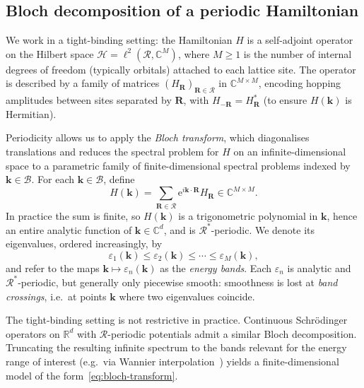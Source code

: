 \documentclass[11pt]{article}
\numberwithin{equation}{section}
\begin{document}
\subsection{Bloch decomposition of a periodic Hamiltonian}\label{sec:bloch}

We work in a tight-binding setting: the Hamiltonian \(H\) is a self-adjoint operator on
the Hilbert space \(\mathcal{H}=\ell^2(\mathcal{R},\mathbb{C}^M)\), where \(M \geq 1\) is the number
of internal degrees of freedom (typically orbitals) attached to each lattice site. The
operator is described by a family of matrices \((H_\mathbf{R})_{\mathbf{R} \in
    \mathcal{R}}\) in \(\mathbb{C}^{M\times M}\), encoding hopping amplitudes between sites
separated by \(\mathbf{R}\), with \(H_{-\mathbf{R}} = H_\mathbf{R}^*\) (to ensure
\(H(\mathbf{k})\) is Hermitian).

Periodicity allows us to apply the \emph{Bloch transform}, which diagonalises translations
and reduces the spectral problem for \(H\) on an infinite-dimensional space to a
parametric family of finite-dimensional spectral problems indexed by \(\mathbf{k} \in
\mathcal{B}\). For each \(\mathbf{k} \in \mathcal{B}\), define
\begin{equation}
    H(\mathbf{k}) = \sum_{\mathbf{R} \in \mathcal{R}}
    \mathrm{e}^{i\mathbf{k}\cdot\mathbf{R}} H_\mathbf{R}
    \in \mathbb{C}^{M\times M}.
    \label{eq:bloch-transform}
\end{equation}
In practice the sum is finite, so \(H(\mathbf{k})\) is a trigonometric polynomial in
\(\mathbf{k}\), hence an entire analytic function of \(\mathbf{k} \in \mathbb{C}^d\), and
is \(\mathcal{R}^*\)-periodic. We denote its eigenvalues, ordered increasingly, by
\begin{equation}
    \varepsilon_1(\mathbf{k}) \leq \varepsilon_2(\mathbf{k}) \leq \cdots
    \leq \varepsilon_M(\mathbf{k}),
\end{equation}
and refer to the maps \(\mathbf{k} \mapsto \varepsilon_n(\mathbf{k})\) as the \emph{energy
    bands}. Each \(\varepsilon_n\) is analytic and \(\mathcal{R}^*\)-periodic, but
generally only piecewise smooth: smoothness is lost at \emph{band crossings}, i.e.\ at
points \(\mathbf{k}\) where two eigenvalues coincide.

\begin{remark}
    The tight-binding setting is not restrictive in practice. Continuous Schrödinger
    operators on \(\mathbb{R}^d\) with \(\mathcal{R}\)-periodic potentials admit a similar
    Bloch decomposition. Truncating the resulting infinite spectrum to	the bands relevant
    for the energy range of interest (e.g.\ via Wannier
    interpolation~\cite{yates2007spectral}) yields a finite-dimensional model of the
    form~\eqref{eq:bloch-transform}.
\end{remark}
\end{document}
